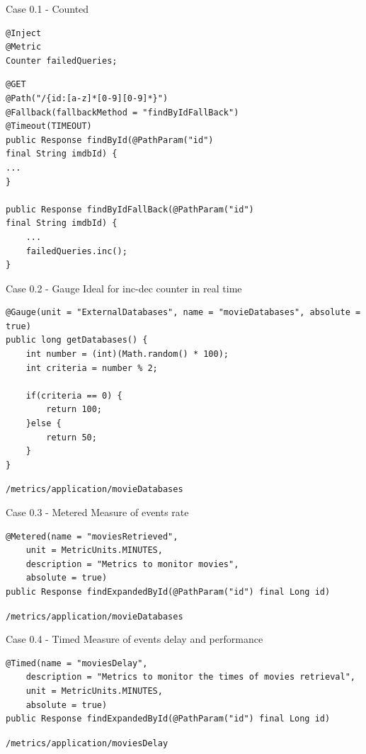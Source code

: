 \documentclass{beamer}
\begin{document}
\begin{frame}[fragile]{Case 0.1 - Counted}
\begin{lstlisting}
@Inject
@Metric
Counter failedQueries;
\end{lstlisting}

\begin{lstlisting}
@GET
@Path("/{id:[a-z]*[0-9][0-9]*}")
@Fallback(fallbackMethod = "findByIdFallBack")
@Timeout(TIMEOUT)
public Response findById(@PathParam("id") 
final String imdbId) {
...
}

public Response findByIdFallBack(@PathParam("id") 
final String imdbId) {
	...
	failedQueries.inc();
}
\end{lstlisting}
\end{frame}

\begin{frame}[fragile]{Case 0.2 - Gauge}
Ideal for inc-dec counter in real time 
\begin{lstlisting}
@Gauge(unit = "ExternalDatabases", name = "movieDatabases", absolute = true)
public long getDatabases() {
	int number = (int)(Math.random() * 100);
	int criteria = number % 2;
	
	if(criteria == 0) {
		return 100;
	}else {
		return 50;
	}
}
\end{lstlisting}

\lstinline|/metrics/application/movieDatabases|
\end{frame}

\begin{frame}[fragile]{Case 0.3 - Metered}
Measure of events rate
\begin{lstlisting}
@Metered(name = "moviesRetrieved",
	unit = MetricUnits.MINUTES,
	description = "Metrics to monitor movies",
	absolute = true)
public Response findExpandedById(@PathParam("id") final Long id) 
\end{lstlisting}

\lstinline|/metrics/application/movieDatabases|
\end{frame}

\begin{frame}[fragile]{Case 0.4 - Timed}
Measure of events delay and performance
\begin{lstlisting}
@Timed(name = "moviesDelay",
	description = "Metrics to monitor the times of movies retrieval",
	unit = MetricUnits.MINUTES,
	absolute = true)
public Response findExpandedById(@PathParam("id") final Long id) 
\end{lstlisting}

\lstinline|/metrics/application/moviesDelay|
\end{frame}
\end{document}
